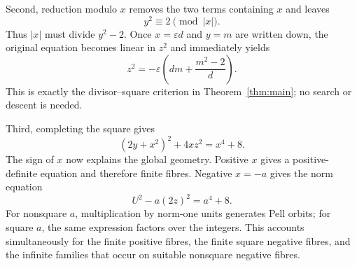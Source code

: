 \documentclass[11pt]{article}
\theoremstyle{remark}
\begin{document}
Second, reduction modulo $x$ removes the two terms containing $x$ and leaves
\[
 y^2\equiv2\pmod{|x|}.
\]
Thus $|x|$ must divide $y^2-2$.  Once $x=\varepsilon d$ and $y=m$ are written down, the original equation becomes linear in $z^2$ and immediately yields
\[
 z^2=-\varepsilon\left(dm+\frac{m^2-2}{d}\right).
\]
This is exactly the divisor--square criterion in Theorem~\ref{thm:main}; no search or descent is needed.

Third, completing the square gives
\[
 (2y+x^2)^2+4xz^2=x^4+8.
\]
The sign of $x$ now explains the global geometry.  Positive $x$ gives a positive-definite equation and therefore finite fibres.  Negative $x=-a$ gives the norm equation
\[
 U^2-a(2z)^2=a^4+8.
\]
For nonsquare $a$, multiplication by norm-one units generates Pell orbits; for square $a$, the same expression factors over the integers.  This accounts simultaneously for the finite positive fibres, the finite square negative fibres, and the infinite families that occur on suitable nonsquare negative fibres.
\end{document}
